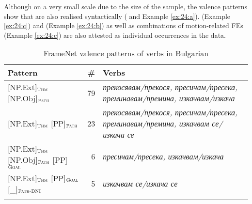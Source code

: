 \documentclass[output=paper,colorlinks,citecolor=brown]{langscibook}
\begin{document}
Although on a very small scale due to the size of the sample, the valence patterns show that  are also realised syntactically ( and Example \ref{ex:24:a}).  (Example \ref{ex:24:c}) and  (Example \ref{ex:24:b}) as well as combinations of motion-related FEs (Example \ref{ex:24:c}) are also attested as individual occurrences in the data.

\begin{table} 
   \begin{tabularx}{\textwidth}{ lrQ } 
   \lspbottomrule
   Pattern & \# & Verbs \\ \midrule
{[NP.Ext]}$_{\text{\textsc{Thm}}}$ {[NP.Obj]}$_{\text{\textsc{Path}}}$ & 79 & \textit{прекосявам\slash прекося, пресичам\slash пресека, преминавам\slash премина, изкачвам\slash изкача}\\ 
{[NP.Ext]}$_{\text{\textsc{Thm}}}$ {[PP]}$_{\text{\textsc{Path}}}$ & 23 & \textit{прекосявам\slash прекося, пресичам\slash пресека, преминавам\slash премина, изкачвам се\slash изкача се}\\ 
{[NP.Ext]}$_{\text{\textsc{Thm}}}$ {[NP.Obj]}$_{\text{\textsc{Path}}}$ {[PP]}$_{\text{\textsc{Goal}}}$ & 6 & \textit{пресичам\slash пресека, изкачвам\slash изкача}\\ 
{[NP.Ext]}$_{\text{\textsc{Thm}}}$ {[PP]}$_{\text{\textsc{Goal}}}$ {[\_]}$_{\text{\textsc{Path-DNI}}}$ & 5 & \textit{изкачвам се\slash изкача се}\\ 
\lspbottomrule
\end{tabularx}
    \caption{FrameNet valence patterns of  verbs in Bulgarian}
    \label{tab:4:traversing-valence-bg}
\end{table}
 
\end{document}
